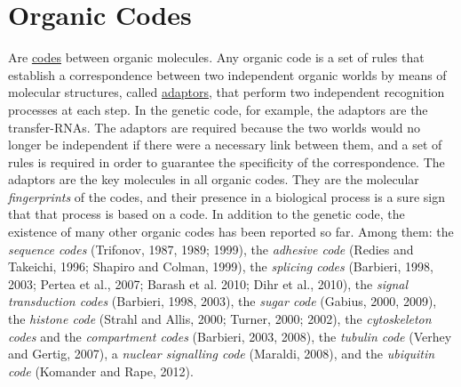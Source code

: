 \documentclass[12pt]{article}
\begin{document}
\section{Organic Codes}
Are \hyperlink{code}{codes} between organic molecules. Any organic code is a set of rules that establish a correspondence between two independent organic worlds by means of molecular structures, called \hyperlink{adaptor}{adaptors}, that perform two independent recognition processes at each step. In the genetic code, for example, the adaptors are the transfer-RNAs. The adaptors are required because the two worlds would no longer be independent if there were a necessary link between them, and a set of rules is required in order to guarantee the specificity of the correspondence. The adaptors are the key molecules in all organic codes. They are the molecular \textit{fingerprints} of the codes, and their presence in a biological process is a sure sign that that process is based on a code. In addition to the genetic code, the existence of many other organic codes has been reported so far. Among them: the \textit{sequence codes} (Trifonov, 1987, 1989; 1999), the \textit{adhesive code} (Redies and Takeichi, 1996; Shapiro and Colman, 1999), the \textit{splicing codes} (Barbieri, 1998, 2003; Pertea et al., 2007; Barash et al. 2010; Dihr et al., 2010), the \textit{signal transduction codes} (Barbieri, 1998, 2003), the \textit{sugar code} (Gabius, 2000, 2009), the \textit{histone code} (Strahl and Allis, 2000; Turner, 2000; 2002), the \textit{cytoskeleton codes} and the \textit{compartment codes} (Barbieri, 2003, 2008), the \textit{tubulin code} (Verhey and Gertig, 2007), a \textit{nuclear signalling code} (Maraldi, 2008), and the \textit{ubiquitin code} (Komander and Rape, 2012). 



\hypertarget{organic_information}{}
\end{document}

